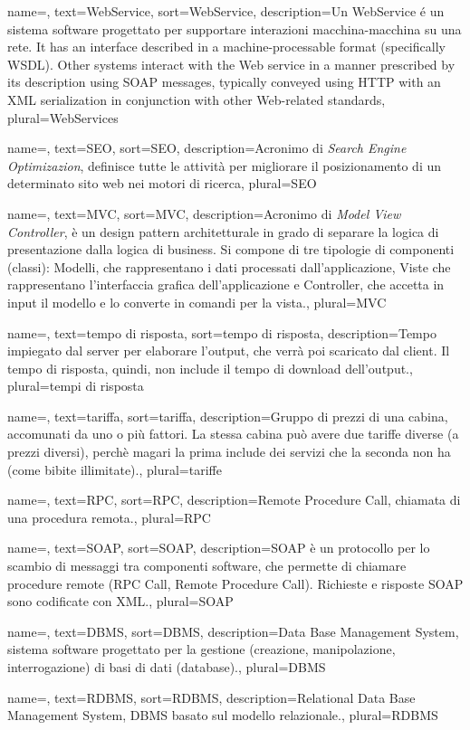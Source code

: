 {
	name=,
	text=WebService,
	sort=WebService,
	description={Un WebService é un sistema software progettato per supportare interazioni macchina-macchina su una rete. It has an interface described in a machine-processable format (specifically WSDL). Other systems interact with the Web service in a manner prescribed by its description using SOAP messages, typically conveyed using HTTP with an XML serialization in conjunction with other Web-related standards},
	plural=WebServices
}


{
	name=,
	text=SEO,
	sort=SEO,
	description={Acronimo di \textit{Search Engine Optimizazion}, definisce tutte le attività per migliorare il posizionamento di un determinato sito web nei motori di ricerca},
	plural=SEO
}


{
	name=,
	text=MVC,
	sort=MVC,
	description={Acronimo di \textit{Model View Controller}, è un design pattern architetturale in grado di separare la logica di presentazione dalla logica di business. Si compone di tre tipologie di componenti (classi): Modelli, che rappresentano i dati processati dall'applicazione, Viste che rappresentano l'interfaccia grafica dell'applicazione e Controller, che accetta in input il modello e lo converte in comandi per la vista.},
	plural=MVC
}


{
	name=,
	text=tempo di risposta,
	sort=tempo di risposta,
	description={Tempo impiegato dal server per elaborare l'output, che verrà poi scaricato dal client. Il tempo di risposta, quindi, non include il tempo di download dell'output.},
	plural=tempi di risposta
}

{
	name=,
	text=tariffa,
	sort=tariffa,
	description={Gruppo di prezzi di una cabina, accomunati da uno o più fattori. La stessa cabina può avere due tariffe diverse (a prezzi diversi), perchè magari la prima include dei servizi che la seconda non ha (come bibite illimitate).},
	plural=tariffe
}

{
	name=,
	text=RPC,
	sort=RPC,
	description={Remote Procedure Call, chiamata di una procedura remota.},
	plural=RPC
}

{
	name=,
	text=SOAP,
	sort=SOAP,
	description={SOAP è un protocollo per lo scambio di messaggi tra componenti software, che permette di chiamare procedure remote (RPC Call, Remote Procedure Call). Richieste e risposte SOAP sono codificate con XML.},
	plural=SOAP
}

{
	name=,
	text=DBMS,
	sort=DBMS,
	description={Data Base Management System, sistema software progettato per la gestione (creazione, manipolazione, interrogazione) di basi di dati (database).},
	plural=DBMS
}

{
	name=,
	text=RDBMS,
	sort=RDBMS,
	description={Relational Data Base Management System, DBMS basato sul modello relazionale.},
	plural=RDBMS
}